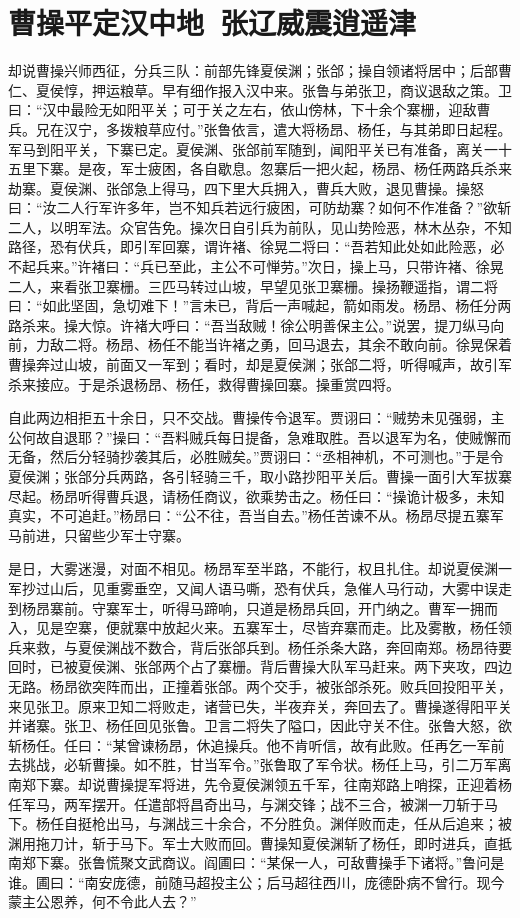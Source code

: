 \chapter{曹操平定汉中地~张辽威震逍遥津}

却说曹操兴师西征，分兵三队：前部先锋夏侯渊；张郃；操自领诸将居中；后部曹仁、夏侯惇，押运粮草。早有细作报入汉中来。张鲁与弟张卫，商议退敌之策。卫曰：“汉中最险无如阳平关；可于关之左右，依山傍林，下十余个寨栅，迎敌曹兵。兄在汉宁，多拨粮草应付。”张鲁依言，遣大将杨昂、杨任，与其弟即日起程。军马到阳平关，下寨已定。夏侯渊、张郃前军随到，闻阳平关已有准备，离关一十五里下寨。是夜，军士疲困，各自歇息。忽寨后一把火起，杨昂、杨任两路兵杀来劫寨。夏侯渊、张郃急上得马，四下里大兵拥入，曹兵大败，退见曹操。操怒曰：“汝二人行军许多年，岂不知兵若远行疲困，可防劫寨？如何不作准备？”欲斩二人，以明军法。众官告免。操次日自引兵为前队，见山势险恶，林木丛杂，不知路径，恐有伏兵，即引军回寨，谓许褚、徐晃二将曰：“吾若知此处如此险恶，必不起兵来。”许褚曰：“兵已至此，主公不可惮劳。”次日，操上马，只带许褚、徐晃二人，来看张卫寨栅。三匹马转过山坡，早望见张卫寨栅。操扬鞭遥指，谓二将曰：“如此坚固，急切难下！”言未已，背后一声喊起，箭如雨发。杨昂、杨任分两路杀来。操大惊。许褚大呼曰：“吾当敌贼！徐公明善保主公。”说罢，提刀纵马向前，力敌二将。杨昂、杨任不能当许褚之勇，回马退去，其余不敢向前。徐晃保着曹操奔过山坡，前面又一军到；看时，却是夏侯渊；张郃二将，听得喊声，故引军杀来接应。于是杀退杨昂、杨任，救得曹操回寨。操重赏四将。

自此两边相拒五十余日，只不交战。曹操传令退军。贾诩曰：“贼势未见强弱，主公何故自退耶？”操曰：“吾料贼兵每日提备，急难取胜。吾以退军为名，使贼懈而无备，然后分轻骑抄袭其后，必胜贼矣。”贾诩曰：“丞相神机，不可测也。”于是令夏侯渊；张郃分兵两路，各引轻骑三千，取小路抄阳平关后。曹操一面引大军拔寨尽起。杨昂听得曹兵退，请杨任商议，欲乘势击之。杨任曰：“操诡计极多，未知真实，不可追赶。”杨昂曰：“公不往，吾当自去。”杨任苦谏不从。杨昂尽提五寨军马前进，只留些少军士守寨。

是日，大雾迷漫，对面不相见。杨昂军至半路，不能行，权且扎住。却说夏侯渊一军抄过山后，见重雾垂空，又闻人语马嘶，恐有伏兵，急催人马行动，大雾中误走到杨昂寨前。守寨军士，听得马蹄响，只道是杨昂兵回，开门纳之。曹军一拥而入，见是空寨，便就寨中放起火来。五寨军士，尽皆弃寨而走。比及雾散，杨任领兵来救，与夏侯渊战不数合，背后张郃兵到。杨任杀条大路，奔回南郑。杨昂待要回时，已被夏侯渊、张郃两个占了寨栅。背后曹操大队军马赶来。两下夹攻，四边无路。杨昂欲突阵而出，正撞着张郃。两个交手，被张郃杀死。败兵回投阳平关，来见张卫。原来卫知二将败走，诸营已失，半夜弃关，奔回去了。曹操遂得阳平关并诸寨。张卫、杨任回见张鲁。卫言二将失了隘口，因此守关不住。张鲁大怒，欲斩杨任。任曰：“某曾谏杨昂，休追操兵。他不肯听信，故有此败。任再乞一军前去挑战，必斩曹操。如不胜，甘当军令。”张鲁取了军令状。杨任上马，引二万军离南郑下寨。却说曹操提军将进，先令夏侯渊领五千军，往南郑路上哨探，正迎着杨任军马，两军摆开。任遣部将昌奇出马，与渊交锋；战不三合，被渊一刀斩于马下。杨任自挺枪出马，与渊战三十余合，不分胜负。渊佯败而走，任从后追来；被渊用拖刀计，斩于马下。军士大败而回。曹操知夏侯渊斩了杨任，即时进兵，直抵南郑下寨。张鲁慌聚文武商议。阎圃曰：“某保一人，可敌曹操手下诸将。”鲁问是谁。圃曰：“南安庞德，前随马超投主公；后马超往西川，庞德卧病不曾行。现今蒙主公恩养，何不令此人去？”

